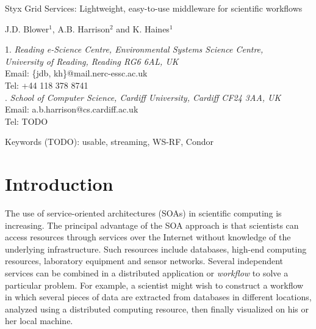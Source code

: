 \documentclass[a4paper]{article}
\begin{document}
\doublespacing

\begin{center}
{\Large Styx Grid Services: Lightweight, easy-to-use middleware for scientific workflows}

\bigskip
\bigskip

{\large J.D. Blower$^{1}$, A.B. Harrison$^{2}$ and K. Haines$^{1}$}

\bigskip

{\small 1. \textit{Reading e-Science Centre, Environmental Systems Science Centre, \\
University of Reading, Reading RG6 6AL, UK} \\
Email: \{jdb, kh\}@mail.nerc-essc.ac.uk\\
Tel: +44 118 378 8741 \\
. \textit{School of Computer Science, Cardiff University, Cardiff CF24 3AA, UK}\\
Email: a.b.harrison@cs.cardiff.ac.uk\\
Tel: TODO}

\bigskip
\bigskip

Keywords (TODO): usable, streaming, WS-RF, Condor

\end{center}

\newpage

\begin{abstract}
The service-oriented approach to performing distributed scientific research is potentially very powerful but is not yet widely used in many scientific fields.  This is partly due to the technical difficulties involved in creating services and composing them into workflows.  We present the Styx Grid Service, a simple system that wraps command-line programs and allows them to be run over the Internet exactly as if they were local programs.  Styx Grid Services are very easy to create and use and can be composed into powerful workflows with simple shell scripts or more sophisticated graphical tools.  Data can be streamed directly from service to service and progress can be monitored asynchronously using a mechanism that places very few demands on firewalls.  SOMETHING ABOUT CONDOR, GLOBUS ETC.  Styx Grid Services can interoperate with Web Services and WS-Resources.
\end{abstract}

\section{Introduction}\label{sec:intro}
The use of service-oriented architectures (SOAs) in scientific computing is increasing.  The principal advantage of the SOA approach is that scientists can access resources through services over the Internet without knowledge of the underlying infrastructure.  Such resources include databases, high-end computing resources, laboratory equipment and sensor networks.  Several independent services can be combined in a distributed application or \textit{workflow\/} to solve a particular problem.  For example, a scientist might wish to construct a workflow in which several pieces of data are extracted from databases in different locations, analyzed using a distributed computing resource, then finally visualized on his or her local machine.
\end{document}
